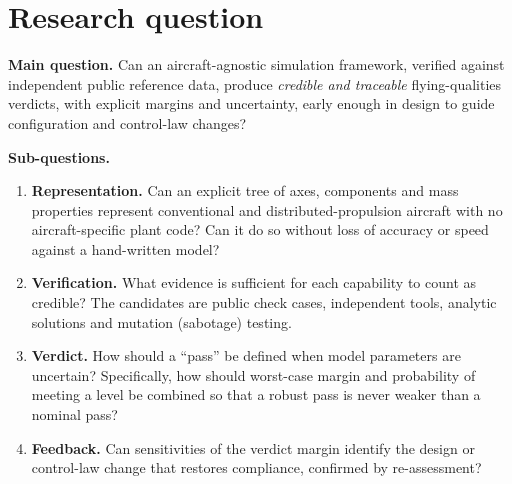 \documentclass[11pt]{article}
\begin{document}
\section{Research question}
\textbf{Main question.} Can an aircraft-agnostic simulation framework, verified
against independent public reference data, produce \emph{credible and
traceable} flying-qualities verdicts, with explicit margins and uncertainty,
early enough in design to guide configuration and control-law changes?

\textbf{Sub-questions.}
\begin{enumerate}[label=RQ\arabic*.]
  \item \textbf{Representation.} Can an explicit tree of axes, components and
    mass properties represent conventional and distributed-propulsion aircraft
    with no aircraft-specific plant code? Can it do so without loss of
    accuracy or speed against a hand-written model?
  \item \textbf{Verification.} What evidence is sufficient for each
    capability to count as credible? The candidates are public check cases,
    independent tools, analytic solutions and mutation (sabotage) testing.
  \item \textbf{Verdict.} How should a ``pass'' be defined when model
    parameters are uncertain? Specifically, how should worst-case margin and
    probability of meeting a level be combined so that a robust pass is never
    weaker than a nominal pass?
  \item \textbf{Feedback.} Can sensitivities of the verdict margin identify
    the design or control-law change that restores compliance, confirmed by
    re-assessment?
\end{enumerate}

\end{document}

